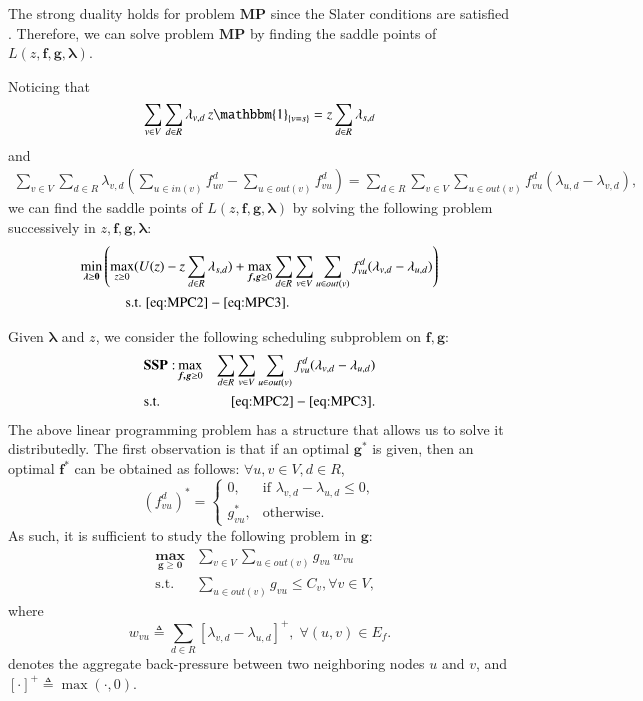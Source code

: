 \documentclass[10pt,conference]{IEEEtran}
\begin{document}
The strong duality holds for problem $\mathbf{MP}$ since the Slater
conditions are satisfied \cite{Boyd04}. Therefore, we can solve problem $\mathbf{MP}$ by finding the saddle points of $L(z,\boldsymbol{f,g,\lambda})$.

Noticing that \begin{align}
\sum_{v\in V}\sum_{d\in R}\lambda_{v,d}\, z\mathbbm{1}_{\left\{ v=s\right\} }=z\sum_{d\in R}\lambda_{s,d}\end{align}
 and \begin{align}
\sum_{v\in V}\sum_{d\in R}\lambda_{v,d}\left(\sum_{u\in in(v)}f_{uv}^{d}-\sum_{u\in out(v)}f_{vu}^{d}\right)=\sum_{d\in R}\sum_{v\in V}\sum_{u\in out(v)}f_{vu}^{d}(\lambda_{u,d}-\lambda_{v,d}),\end{align}
 we can find the saddle points of $L(z,\boldsymbol{f,g,\lambda})$
by solving the following problem successively in $z,\boldsymbol{f},\boldsymbol{g},\boldsymbol{\lambda}$:
\begin{align}
\mathbf{\min_{\boldsymbol{\lambda}\geq0}} & \left(\max_{z\geq0}(U(z)-z\sum_{d\in R}\lambda_{s,d})+\max_{\boldsymbol{f,g}\geq0}\sum_{d\in R}\sum_{v\in V}\sum_{u\in out(v)}f_{vu}^{d}(\lambda_{v,d}-\lambda_{u,d})\right)\label{eq:DP}\\
 & \;\;\;\;\;\;\mbox{s.t.}\;\eqref{eq:MPC2}-\eqref{eq:MPC3}.\nonumber \end{align}


Given $\boldsymbol{\lambda}$ and $z$, we consider the following
scheduling subproblem on $\boldsymbol{f,g}$: \begin{eqnarray}
 & \mathbf{SSP:}\max_{\boldsymbol{f,g}\geq0} & \sum_{d\in R}\sum_{v\in V}\sum_{u\in out(v)}f_{vu}^{d}(\lambda_{v,d}-\lambda_{u,d})\\
 & \mbox{s.t.} & \eqref{eq:MPC2}-\eqref{eq:MPC3}.\nonumber \end{eqnarray}
 The above linear programming problem has a structure that allows
us to solve it distributedly. The first observation is that if
an optimal $\boldsymbol{g}^{*}$ is given, then an optimal $\boldsymbol{f}^{*}$
can be obtained as follows: $\forall u,v\in V,d\in R$, \begin{equation}
\left(f_{vu}^{d}\right)^{*}=\begin{cases}
0, & \mbox{if }\lambda_{v,d}-\lambda_{u,d}\leq0,\\
g_{vu}^{*}, & \mbox{otherwise.}\end{cases}\end{equation}
 As such, it is sufficient to study the following problem in $\boldsymbol{g}$:
\begin{eqnarray}
 & \mathbf{\max_{\boldsymbol{g\ge0}}} & \sum_{v\in V}\sum_{u\in out(v)}g_{vu}\, w_{vu}\\
 & \mbox{s.t.} & \sum_{u\in out(v)}g_{vu}\leq C_{v},\forall v\in V,\nonumber \end{eqnarray}
 where \begin{equation}
w_{vu}\triangleq\sum_{d\in R}[\lambda_{v,d}-\lambda_{u,d}]^{+},\;\forall(u,v)\in E_{f}.\label{eq:back-pressure}\end{equation}
 denotes the aggregate back-pressure between two neighboring nodes
$u$ and $v$, and $[\cdot]^{+}\triangleq\max(\cdot,0)$.
\end{document}
